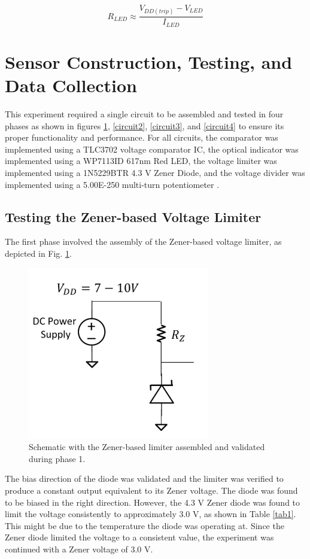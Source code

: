 \documentclass[conference]{IEEEtran}
\begin{document}
\begin{equation}
R_{LED} \approx \frac{V_{DD(trip)} - V_{LED}}{I_{LED}}\label{eq_4}
\end{equation}

\section{Sensor Construction, Testing, and Data Collection}

This experiment required a single circuit to be assembled and tested in four phases as shown in figures \ref{circuit1}, \ref{circuit2},  \ref{circuit3}, and \ref{circuit4} to ensure its proper functionality and performance. For all circuits, the comparator was implemented using a TLC3702 voltage comparator IC, the optical indicator was implemented using a WP7113ID 617nm Red LED, the voltage limiter was implemented using a 1N5229BTR 4.3 V Zener Diode, and the voltage divider was implemented using a 5.00E-250 multi-turn potentiometer \cite{parts}.

\subsection{Testing the Zener-based Voltage Limiter}

The first phase involved the assembly of the Zener-based voltage limiter, as depicted in Fig. \ref{circuit1}.

\begin{figure}[htbp]
\centerline{\includegraphics{./images/circuit1.png}}
\caption{Schematic with the Zener-based limiter assembled and validated during phase 1. \cite{week7}}
\label{circuit1}
\end{figure}

The bias direction of the diode was validated and the limiter was verified to produce a constant output equivalent to its Zener voltage. The diode was found to be biased in the right direction. However, the 4.3 V Zener diode was found to limit the voltage consistently to approximately 3.0 V, as shown in Table \ref{tab1}. This might be due to the temperature the diode was operating at. Since the Zener diode limited the voltage to a consistent value, the experiment was continued with a Zener voltage of 3.0 V.
\end{document}
